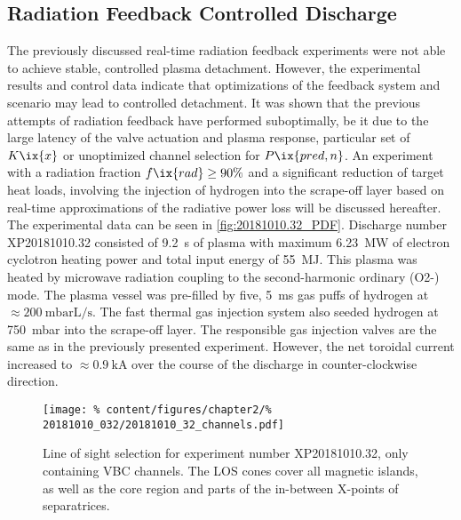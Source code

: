         \subsection{Radiation Feedback Controlled Discharge}\label{subsec:primew7xfeedback}%
%
            The previously discussed real-time radiation feedback experiments were not able to achieve stable, controlled plasma detachment. However, the experimental results and control data indicate that optimizations of the feedback system and scenario may lead to controlled detachment. It was shown that the previous attempts of radiation feedback have performed suboptimally, be it due to the large latency of the valve actuation and plasma response, particular set of $K\ix{x}$ or unoptimized channel selection for $P\ix{pred, n}$. An experiment with a radiation fraction $f\ix{rad}\ge90\%$ and a significant reduction of target heat loads, involving the injection of hydrogen into the scrape-off layer based on real-time approximations of the radiative power loss will be discussed hereafter.\\%
            The experimental data can be seen in \cref{fig:20181010.32_PDF}. Discharge number XP20181010.32 consisted of \SI{9.2}{\second} of plasma with maximum \SI{6.23}{\mega\watt} of electron cyclotron heating power and total input energy of \SI{55}{\mega\joule}. This plasma was heated by microwave radiation coupling to the second-harmonic ordinary (O2-) mode. The plasma vessel was pre-filled by five, \SI{5}{\milli\second} gas puffs of hydrogen at $\approx\SI{200}{\milli\bar\liter\per\second}$. The fast thermal gas injection system also seeded hydrogen at \SI{750}{\milli\bar} into the scrape-off layer. The responsible gas injection valves are the same as in the previously presented experiment. However, the net toroidal current increased to $\approx\SI{0.9}{\kilo\ampere}$ over the course of the discharge in counter-clockwise direction.\\%
%
            \begin{figure}[t]%
                \centering%
                \captionsetup{width=.45\textwidth}%
                \begin{minipage}[c]{0.45\textwidth}%
                    \caption{Line of sight selection for experiment number XP20181010.32, only containing VBC channels. The LOS cones cover all magnetic islands, as well as the core region and parts of the in-between X-points of separatrices.}\label{fig:20181010.32_channels}%
                \end{minipage}%
                \hfill%
                \begin{minipage}[c]{0.5\textwidth}%
                    \texttt{[image: \%
                        content/figures/chapter2/\%
                        20181010\_032/20181010\_32\_channels.pdf]}%
                \end{minipage}%
            \end{figure}%
